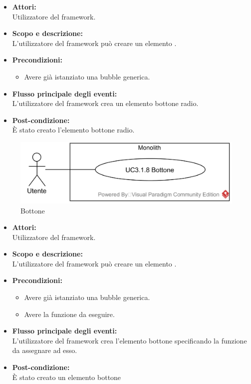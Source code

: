 \begin{itemize}
	\item \textbf{Attori:}
	\\Utilizzatore del framework.
	\item \textbf{Scopo e descrizione:} 
	\\L'utilizzatore del framework può creare un elemento .
	\item \textbf{Precondizioni:}
	\begin{itemize}
		\item Avere già istanziato una bubble generica.
	\end{itemize}
	\item \textbf{Flusso principale degli eventi:}
	\\L'utilizzatore del framework crea un elemento bottone radio.
	\item \textbf{Post-condizione:}
	\\È stato creato l'elemento bottone radio.
\end{itemize}

\begin{samepage}
\nopagebreak
\begin{figure}[H]
	\centering
	\includegraphics[width=15cm]{../../documenti/AnalisiDeiRequisiti/Diagrammi_img/usecase/uc1_32.png}
	\caption{\UCFFCaption{} Bottone}
\end{figure}
\end{samepage}

\begin{itemize}
	\item \textbf{Attori:}
	\\Utilizzatore del framework.
	\item \textbf{Scopo e descrizione:} 
	\\L'utilizzatore del framework può creare un elemento .
	\item \textbf{Precondizioni:}
	\begin{itemize}
		\item Avere già istanziato una bubble generica.
		\item Avere la funzione da eseguire.
	\end{itemize}
	\item \textbf{Flusso principale degli eventi:}
	\\L'utilizzatore del framework crea l'elemento bottone specificando la funzione da assegnare ad esso.
	\item \textbf{Post-condizione:}
	\\È stato creato un elemento bottone
\end{itemize}

